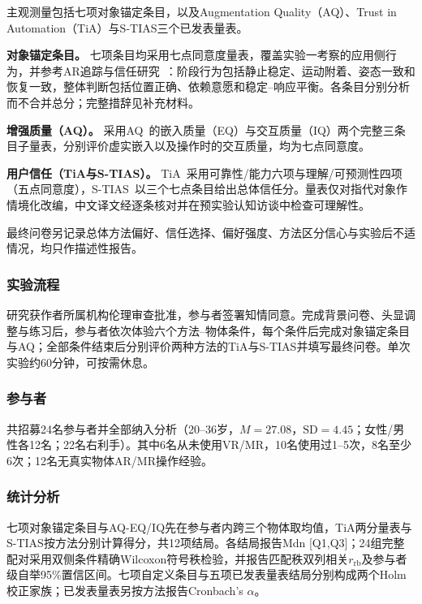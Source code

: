 \documentclass[review]{vgtc}
\begin{document}
主观测量包括七项对象锚定条目，以及Augmentation Quality（AQ）、Trust in Automation（TiA）与S-TIAS三个已发表量表。

\textbf{对象锚定条目。}
七项条目均采用七点同意度量表，覆盖实验一考察的应用侧行为，并参考AR追踪与信任研究~\cite{trustar2024}：阶段行为包括静止稳定、运动附着、姿态一致和恢复一致，整体判断包括位置正确、依赖意愿和稳定--响应平衡。各条目分别分析而不合并总分；完整措辞见补充材料。


\textbf{增强质量（AQ）。}
采用AQ~\cite{aq2026}的嵌入质量（EQ）与交互质量（IQ）两个完整三条目子量表，分别评价虚实嵌入以及操作时的交互质量，均为七点同意度。

\textbf{用户信任（TiA与S-TIAS）。}
TiA~\cite{tia2019}采用可靠性/能力六项与理解/可预测性四项（五点同意度），S-TIAS~\cite{stias2025}以三个七点条目给出总体信任分。量表仅对指代对象作情境化改编，中文译文经逐条核对并在预实验认知访谈中检查可理解性。

最终问卷另记录总体方法偏好、信任选择、偏好强度、方法区分信心与实验后不适情况，均只作描述性报告。

\subsubsection{实验流程}

研究获作者所属机构伦理审查批准，参与者签署知情同意。完成背景问卷、头显调整与练习后，参与者依次体验六个方法--物体条件，每个条件后完成对象锚定条目与AQ；全部条件结束后分别评价两种方法的TiA与S-TIAS并填写最终问卷。单次实验约60分钟，可按需休息。

\subsubsection{参与者}

共招募24名参与者并全部纳入分析（20--36岁，$M=27.08$，$\mathrm{SD}=4.45$；女性/男性各12名；22名右利手）。其中6名从未使用VR/MR，10名使用过1--5次，8名至少6次；12名无真实物体AR/MR操作经验。

\subsubsection{统计分析}

七项对象锚定条目与AQ-EQ/IQ先在参与者内跨三个物体取均值，TiA两分量表与S-TIAS按方法分别计算得分，共12项结局。各结局报告Mdn [Q1,Q3]；24组完整配对采用双侧条件精确Wilcoxon符号秩检验，并报告匹配秩双列相关$r_{\mathrm{rb}}$及参与者级自举95\%置信区间。七项自定义条目与五项已发表量表结局分别构成两个Holm校正家族；已发表量表另按方法报告Cronbach's $\alpha$。
\end{document}
